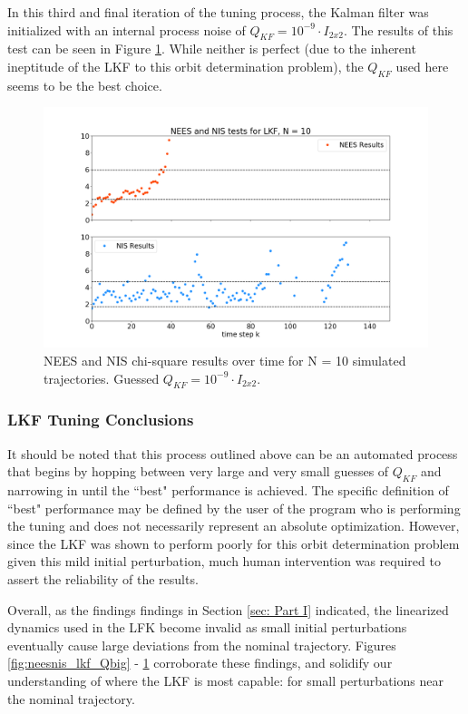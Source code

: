 \documentclass[11pt, a4paper]{article}
\begin{document}
In this third and final iteration of the tuning process, the Kalman filter was initialized with an internal process noise of $Q_{KF} = 10^{-9} \cdot I_{2 x 2}$. 
The results of this test can be seen in Figure \ref{fig:neesnis_lkf}.
While neither is perfect (due to the inherent ineptitude of the LKF to this orbit determination problem), the $Q_{KF}$ used here seems to be the best choice. 

\begin{figure}[H]
	\centering
	\includegraphics[width=\textwidth]{Figures/NEESNIS_lkf_N10Q1.0E-09.png}
	\caption{NEES and NIS chi-square results over time for N = 10 simulated trajectories. Guessed $Q_{KF} = 10^{-9} \cdot I_{2 x 2}$.}
	\label{fig:neesnis_lkf}
\end{figure}

\subsubsection{LKF Tuning Conclusions}
It should be noted that this process outlined above can be an automated process that begins by hopping between very large and very small guesses of $Q_{KF}$ and narrowing in until the ``best" performance is achieved. 
The specific definition of ``best" performance may be defined by the user of the program who is performing the tuning and does not necessarily represent an absolute optimization. 
However, since the LKF was shown to perform poorly for this orbit determination problem given this mild initial perturbation, much human intervention was required to assert the reliability of the results. 

Overall, as the findings findings in Section \ref{sec: Part I} indicated, the linearized dynamics used in the LFK become invalid as small initial perturbations eventually cause large deviations from the nominal trajectory. 
Figures \ref{fig:neesnis_lkf_Qbig} - \ref{fig:neesnis_lkf} corroborate these findings, and solidify our understanding of where the LKF is most capable: for small perturbations near the nominal trajectory.  
\end{document}
